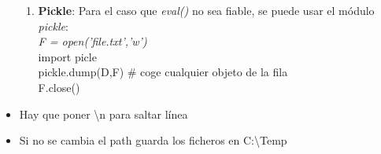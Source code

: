 \begin{itemize}
\begin{enumerate}
		\item \textbf{Pickle}:
		Para el caso que \textit{eval()} no sea fiable, se puede usar el módulo \textit{pickle}:\\
		\textit{F = open('file.txt','w')}\\
		import picle \\
		pickle.dump(D,F) \# coge cualquier objeto de la fila\\
		F.close() \\
		\end{enumerate}

	\item Hay que poner \textbackslash n para saltar línea
	\item Si no se cambia el path guarda los ficheros en C:\textbackslash Temp

	\end{itemize}